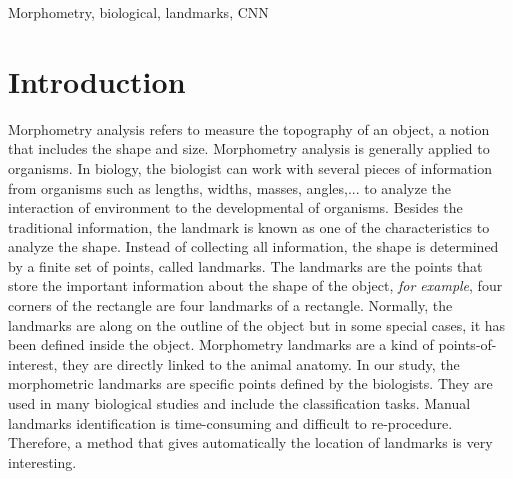 \documentclass[conference]{IEEEtran}
\begin{document}
\begin{IEEEkeywords}
Morphometry, biological, landmarks, CNN
\end{IEEEkeywords}

\section{Introduction}
Morphometry analysis refers to measure the topography of an object, a notion that includes the shape and size. Morphometry analysis is generally applied to organisms. In biology, the biologist can work with several pieces of information from organisms such as lengths, widths, masses, angles,... to analyze the interaction of environment to the developmental of organisms. Besides the traditional information, the landmark is known as one of the characteristics to analyze the shape. Instead of collecting all information, the shape is determined by a finite set of points, called landmarks. The landmarks are the points that store the important information about the shape of the object, \textit{for example}, four corners of the rectangle are four landmarks of a rectangle. Normally, the landmarks are along on the outline of the object but in some special cases, it has been defined inside the object. Morphometry landmarks are a kind of points-of-interest, they are directly linked to the animal anatomy. In our study, the morphometric landmarks are specific points defined by the biologists. They are used in many biological studies and include the classification tasks. Manual landmarks identification is time-consuming and difficult to re-procedure. Therefore, a method that gives automatically the location of landmarks is very interesting.
\end{document}
